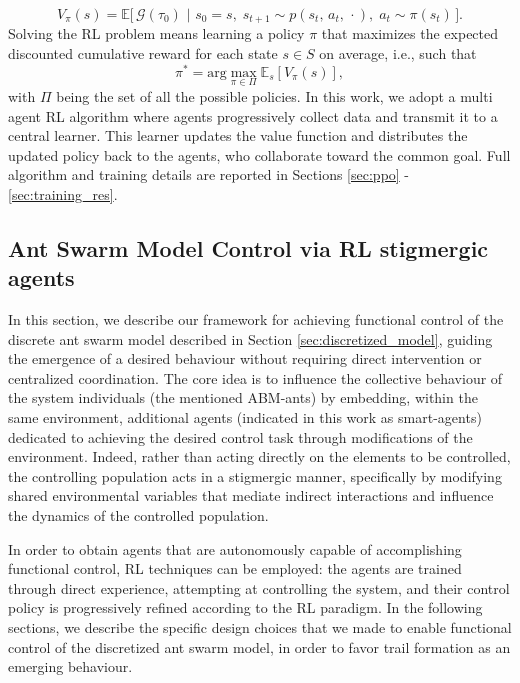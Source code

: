 \documentclass[pdflatex,sn-mathphys-num]{sn-jnl}%
\theoremstyle{thmstyleone}%
\theoremstyle{thmstyletwo}%
\theoremstyle{thmstylethree}%
\begin{document}
\begin{equation}
\label{eq:2.2}
     V_{\pi}(s) = \mathbb{E}\Big[ \,  \mathcal{G}(\tau_0) \,\, \vert \,\, s_0 = s ,\; s_{t+1} \sim p(s_t, \, a_t, \, \cdot ) ,\;  a_t \sim \pi(s_t) \, \Big].
\end{equation}
Solving the RL problem means learning a policy $\pi$ that maximizes the expected discounted cumulative reward for each state $s \in S$ on average, i.e., such that 
\begin{equation}
\pi^{*} = \text{arg}\max_{\pi \in \Pi} \mathbb{E}_{s}[V_{\pi}(s)],
\label{eq:RL-pb}
\end{equation}
with $\Pi$ being the set of all the possible policies.
In this work, we adopt a multi agent RL algorithm where agents progressively collect data and transmit it to a central learner. This learner updates the value function and distributes the updated policy back to the agents, who collaborate toward the common goal.
Full algorithm and training details are reported in Sections \ref{sec:ppo} - \ref{sec:training_res}.


\subsection{Ant Swarm Model Control via RL stigmergic agents}
\label{sec:RLDesign}
In this section, we describe our framework for achieving functional control of the discrete ant swarm model described in Section \ref{sec:discretized_model}, guiding the emergence of a desired behaviour without requiring direct intervention or centralized coordination. The core idea is to influence the collective behaviour of the system individuals (the mentioned ABM-ants) by embedding, within the same environment, additional agents (indicated in this work as smart-agents) dedicated to achieving the desired control task through modifications of the environment. Indeed, rather than acting directly on the elements to be controlled, the controlling population acts in a stigmergic manner, specifically by modifying shared environmental variables that mediate indirect interactions and influence the dynamics of the controlled population. 

In order to obtain agents that are autonomously capable of accomplishing functional control, RL techniques can be employed: the agents are trained through direct experience, attempting at controlling the system, and their control policy is progressively refined according to the RL paradigm. In the following sections, we describe the specific design choices that we made to enable functional control of the discretized ant swarm model, in order to favor trail formation as an emerging behaviour. 
\end{document}
